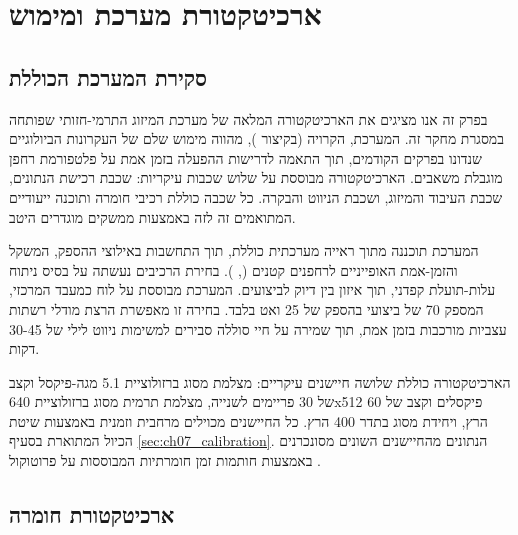 

\section{ארכיטקטורת מערכת ומימוש}
\label{sec:ch07_system_architecture}

\subsection{סקירת המערכת הכוללת}
\label{sec:ch07_overview}

בפרק זה אנו מציגים את הארכיטקטורה המלאה של מערכת המיזוג התרמי-חזותי שפותחה במסגרת מחקר זה. המערכת, הקרויה  (בקיצור ), מהווה מימוש שלם של העקרונות הביולוגיים שנדונו בפרקים הקודמים, תוך התאמה לדרישות ההפעלה בזמן אמת על פלטפורמת רחפן מוגבלת משאבים. הארכיטקטורה מבוססת על שלוש שכבות עיקריות: שכבת רכישת הנתונים, שכבת העיבוד והמיזוג, ושכבת הניווט והבקרה. כל שכבה כוללת רכיבי חומרה ותוכנה ייעודיים המתואמים זה לזה באמצעות ממשקים מוגדרים היטב.

המערכת תוכננה מתוך ראייה מערכתית כוללת, תוך התחשבות באילוצי ההספק, המשקל והזמן-אמת האופייניים לרחפנים קטנים (, ). בחירת הרכיבים נעשתה על בסיס ניתוח עלות-תועלת קפדני, תוך איזון בין דיוק לביצועים. המערכת מבוססת על לוח  כמעבד המרכזי, המספק 70  של ביצועי  בהספק של 25 ואט בלבד. בחירה זו מאפשרת הרצת מודלי רשתות עצביות מורכבות בזמן אמת, תוך שמירה על חיי סוללה סבירים למשימות ניווט לילי של 30-45 דקות.

הארכיטקטורה כוללת שלושה חיישנים עיקריים: מצלמת  מסוג  ברזולוציית 5.1 מגה-פיקסל וקצב של 30 פריימים לשנייה, מצלמת תרמית מסוג  ברזולוציית 640x512 פיקסלים וקצב של 60 הרץ, ויחידת  מסוג  בתדר 400 הרץ. כל החיישנים מכוילים מרחבית וזמנית באמצעות שיטת הכיול המתוארת בסעיף \ref{sec:ch07_calibration}. הנתונים מהחיישנים השונים מסונכרנים באמצעות חותמות זמן חומרתיות המבוססות על פרוטוקול .

\subsection{ארכיטקטורת חומרה}
\label{sec:ch07_hardware}

